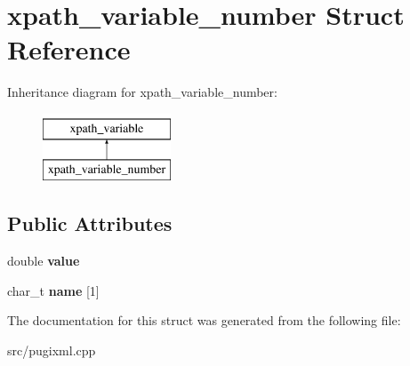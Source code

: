 \hypertarget{structxpath__variable__number}{}\section{xpath\+\_\+variable\+\_\+number Struct Reference}
\label{structxpath__variable__number}
Inheritance diagram for xpath\+\_\+variable\+\_\+number\+:\begin{figure}[H]
\begin{center}
\leavevmode
\includegraphics[height=2.000000cm]{structxpath__variable__number}
\end{center}
\end{figure}
\subsection*{Public Attributes}
\begin{DoxyCompactItemize}
\item 
\mbox{\label{structxpath__variable__number_a49949397348e7c941d88a694ec5c8e57}} 
double {\bfseries value}
\item 
\mbox{\label{structxpath__variable__number_a2bf4163dab1a8e233d45677fee987f0f}} 
char\+\_\+t {\bfseries name} \mbox{[}1\mbox{]}
\end{DoxyCompactItemize}


The documentation for this struct was generated from the following file\+:\begin{DoxyCompactItemize}
\item 
src/pugixml.\+cpp\end{DoxyCompactItemize}
